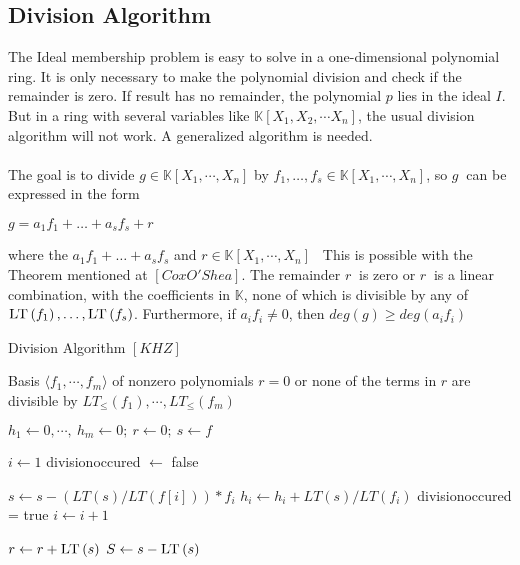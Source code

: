 \subsection{Division Algorithm}
\label{subsec:division}

The Ideal membership problem is easy to solve in a one-dimensional polynomial ring. It is only necessary to make the polynomial division and check if the remainder is zero. 
If result has no remainder, the polynomial $p$ lies in the ideal $I$.
But in a ring with several variables like $ \mathbb{K} \left[X_{1},X_{2},\cdots X_{n}\right]$, the usual division algorithm will not work. A generalized algorithm is needed.\\ \\
The goal is to divide $g \in \mathbb{K}\left[X_{1}, \cdots, X_{n}\right] $ by 
$f_{1}, \ldots, f_{s} \in \mathbb{K}\left[X_{1}, \cdots, X_{n}\right]$, so $g~$ can be expressed in the form \begin{center}
$g = a_{1}f_{1}+ \ldots + a_{s}f_{s} +r$
\end{center} 
where the $a_{1}f_{1}+ \ldots + a_{s}f_{s} $ and $r \in \mathbb{K}\left[X_{1}, \cdots, X_{n}\right]$ \
This is possible with the Theorem mentioned at  $\left[ Cox O'Shea\right] $.
The remainder $r~$ is zero or $r~$ is a linear combination, with the coefficients in $\mathbb{K}$, none of which is divisible by any of
$\textsc{LT}\left(f_{1} \right), \ldots, \textsc{LT}\left(f_{s} \right)  $.
Furthermore, if $a_{i}f_{i} \neq 0 $, then
$deg(g) \geq deg(a_{i}f_{i})$

\newpage


\begin{algorithm}
\caption{Division Algorithm $[KHZ]$}
\label{alg:division}
\begin{algorithmic}[1]

\Require Basis $\langle f_{1}, \cdots, f_{m}\rangle$ of nonzero polynomials  
\Ensure $r=0$ or none of the terms in $r$ are divisible by $ LT_{\leq}\left( f_{1}\right) , \cdots , LT_{\leq} \left( f_{m}\right) $

\State $ h_{1} \gets 0 , \cdots ,~h_{m} \gets 0;~r \gets 0;~s \gets f  $

\State $ i \gets 1 $
\State  division\textunderscore occured $ \gets $  false 

\State $ s \gets s - ( LT \left( s\right)/ LT \left( f \left[ i\right] \right))  \ast f_{i} $
\State $h_{i} \gets h_{i} + LT\left( s\right) / LT\left( f_{i}\right) $
\State division\textunderscore occured = true
\Else
\State $i \gets i+1$
\EndIf
\EndWhile

\State $ r \gets r + \textsc{LT}\left( s\right) $
\State $ S \gets s - \textsc{LT}\left( s\right) $
\EndIf

\EndWhile


\end{algorithmic}
\end{algorithm}


